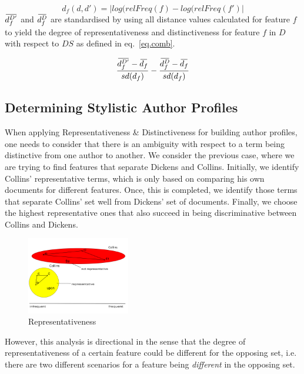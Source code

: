 \documentclass[a4paper,10pt,twoside,fleqn]{article}
\newcommand{\overbar}[1]{\mkern 2.0mu\overline{\mkern-2.0mu#1\mkern-2.0mu}\mkern 2.0mu}
\begin{document}
\begin{equation} \label{eq.dist}
 d_f(d,d') = |log(relFreq(f) - log(relFreq(f')|
\end{equation}
$\overbar{d_f^{D'}}$  and $\overbar{d_f^{D}}$ are standardised by using all 
distance values calculated for feature $f$ to yield the 
degree of representativeness and distinctiveness for
feature $f$ in $D$ with respect to $DS$ as defined in eq.~\ref{eq.comb}.
 
 \begin{equation}\label{eq.comb}
\frac{\overbar{d^{D'}_f} - \overbar{d_f} }{sd(d_f)} - \frac{\overbar{d^{D}_f} - \overbar{d_f}}{sd(d_f)}
\end{equation}


\subsection{Determining Stylistic Author Profiles}

When applying Representativeness \& Distinctiveness for building author profiles, 
one needs to consider that there is an ambiguity with respect to a term being 
distinctive from one author to another. 
We consider the previous case, where we are trying to find features that 
separate Dickens and Collins. 
Initially, we identify Collins' representative terms, which is only based on
comparing his own documents for different features. Once, this is completed, 
we identify those terms that separate Collins' set well from Dickens' set
of documents. 
Finally, we choose the highest representative ones that also succeed in
being discriminative between Collins and Dickens. 

\begin{figure}
  \caption{Representativeness}
 \begin{center}
  \includegraphics[width=0.4\textwidth]{figures/repres1-fin.png}
  \end{center}
 \end{figure}
 
However, this analysis is directional in the sense that the degree
of representativeness of a certain feature could be different 
for the opposing set, i.e. there are two different scenarios
for a feature being \emph{different} in the opposing set. 
\end{document}
